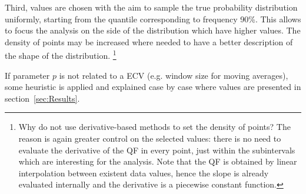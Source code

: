 Third, values are chosen with the aim to sample the true probability distribution uniformly, starting from the quantile corresponding to frequency 90\%. This allows to focus the analysis on the side of the distribution which have higher values. The density of points may be increased where needed to have a better description of the shape of the distribution.%
\footnote{Why do not use derivative-based methods to set the density of points? The reason is again greater control on the selected values: there is no need to evaluate the derivative of the \gls{QF} in every point, just within the subintervals which are interesting for the analysis. Note that the \gls{QF} is obtained by linear interpolation between existent data values, hence the slope is already evaluated internally and the derivative is a piecewise constant function.}

If parameter $p$ is not related to a \gls{ECV} (e.g. window size for moving averages), some heuristic is applied and explained case by case where values are presented in section~\ref{sec:Results}.

